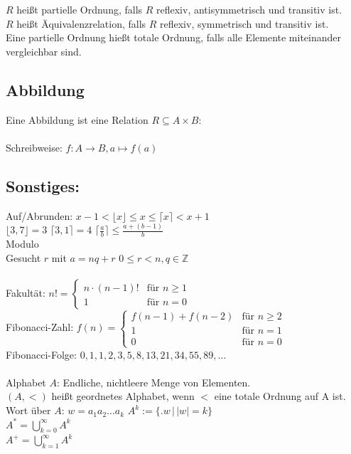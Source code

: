 \documentclass[10pt,a4paper]{scrartcl}
\newcommand{\iset}[2]{\ensuremath{\bigl\{ \bigl. #1 \, \bigr| \, #2 \bigr\}}}	%
\begin{document}
$R$ heißt partielle Ordnung, falls $R$ reflexiv, antisymmetrisch und transitiv ist.\\
$R$ heißt Äquivalenzrelation, falls $R$ reflexiv, symmetrisch und transitiv ist.\\
Eine partielle Ordnung hießt totale Ordnung, falls alle Elemente miteinander vergleichbar sind.\\


\subsection{Abbildung}
Eine Abbildung ist eine Relation $R \subseteq A \times B$: \\
\boxed{ \forall a \in A: | \iset{b \in B}{(a,b)\in R}| = 1 } \\
Schreibweise: $f: A \rightarrow B, a \mapsto f(a)$\\


\subsection{Sonstiges:}
Auf/Abrunden: $x-1 < \lfloor x \rfloor \le x \le \lceil x \rceil < x+1$\\
$\lfloor 3,7 \rfloor = 3$ \qquad $\lceil 3,1 \rceil = 4$ \qquad $\lceil \frac{a}{b} \rceil \le \frac{a+(b-1)}{b}$\\[0.5em]
Modulo \\
Gesucht $r$ mit $a = nq +r$ \qquad $0 \le r < n, q \in \mathbb Z$\\
\\
Fakultät: $n! = \begin{cases} n \cdot (n-1)! & \text{für } n \ge 1 \\ 1  & \text{für } n = 0 \end{cases}$\\
Fibonacci-Zahl: $f(n) = \begin{cases} f(n-1) + f(n-2) & \text{für } n\ge 2\\ 1 & \text{für } n = 1 \\ 0 & \text{für } n = 0 \end{cases}$\\
Fibonacci-Folge: $0,1,1,2,3,5,8,13,21,34,55,89,...$\\
\\
Alphabet $A$: Endliche, nichtleere Menge von Elementen.\\
$(A,<)$ heißt geordnetes Alphabet, wenn $<$ eine totale Ordnung auf A ist.\\
Wort über $A$: $w=a_1 a_2 \ldots a_k$
$A^k := \iset{w}{|w|=k}$\\
$A^{*} = \bigcup\limits_{k=0}^\infty A^k$\\
$A^{+} = \bigcup\limits_{k=1}^\infty A^k$
\end{document}
